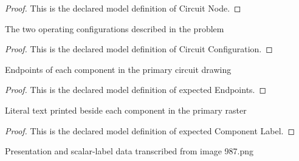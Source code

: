\begin{proof}
  This is the declared model definition of Circuit Node.
\end{proof}
\begin{definition}
  \label{def:physics:phyx-mini-0987:phyxminiproblems-problemphyxmini0987-circuitconfiguration}
  The two operating configurations described in the problem
\end{definition}
\begin{proof}
  This is the declared model definition of Circuit Configuration.
\end{proof}
\begin{definition}
  \label{def:physics:phyx-mini-0987:phyxminiproblems-problemphyxmini0987-expectedendpoints}
  Endpoints of each component in the primary circuit drawing
\end{definition}
\begin{proof}
  This is the declared model definition of expected Endpoints.
\end{proof}
\begin{definition}
  \label{def:physics:phyx-mini-0987:phyxminiproblems-problemphyxmini0987-expectedcomponentlabel}
  Literal text printed beside each component in the primary raster
\end{definition}
\begin{proof}
  This is the declared model definition of expected Component Label.
\end{proof}
\begin{definition}
  \label{def:physics:phyx-mini-0987:phyxminiproblems-problemphyxmini0987-switchedlcfigure}
  Presentation and scalar-label data transcribed from image 987.png
\end{definition}
